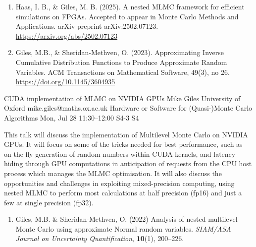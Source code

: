 \begin{talk}
\begin{enumerate}
    \item[{[2]}] Haas, I. B., \& Giles, M. B. (2025). A nested MLMC framework for efficient simulations on FPGAs. Accepted to appear in Monte Carlo Methods and Applications. arXiv preprint arXiv:2502.07123. \url{https://arxiv.org/abs/2502.07123}

     \item[{[3]}] Giles, M.B., \& Sheridan-Methven, O. (2023). Approximating Inverse Cumulative Distribution Functions to Produce Approximate Random Variables. ACM Transactions on Mathematical Software, 49(3), no 26. \url{https://doi.org/10.1145/3604935}
\end{enumerate}

\end{talk}

\begin{talk}
  {CUDA implementation of MLMC on NVIDIA GPUs}%
  {Mike Giles}%
  {University of Oxford}%
  {mike.giles@maths.ox.ac.uk}%
  {Hardware or Software for (Quasi-)Monte Carlo Algorithms}%
  {}%
  {Mon, Jul 28 11:30--12:00}%
  {S4-3}%
  {S4}%
    
   

This talk will discuss the implementation of Multilevel Monte Carlo
on NVIDIA GPUs.  It will focus on some of the tricks needed for best
performance, such as on-the-fly generation of random numbers within
CUDA kernels, and latency-hiding through GPU computations in anticipation
of requests from the CPU host process which manages the MLMC optimisation.
It will also discuss the opportunities and challenges in exploiting
mixed-precision computing, using nested MLMC to perform most calculations
at half precision (fp16) and just a few at single precision (fp32).

\medskip

\begin{enumerate}
\item[{[1]}] Giles, M.B. \& Sheridan-Methven, O. (2022)
  Analysis of nested multilevel Monte Carlo using approximate
  Normal random variables. {\it SIAM/ASA
Journal on Uncertainty Quantification}, \textbf{10}(1), 200--226.
\end{enumerate}

\end{talk}

